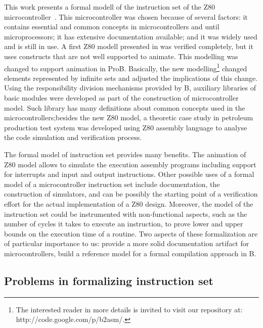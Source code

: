 \documentclass[a4paper]{llncs}
\begin{document}
This work presents a formal modell of the instruction set of the Z80 
microcontroller~\cite{Z80_manual}. This microcontroller
was chosen because of several factors: it contains essential and common
concepts in microcontrollers and until microprocessors; it has extensive
documentation available; and it was widely used and is still in use. 
A first Z80 modell presented in \cite{Valerio_SBMF09} was verified completely,
but it uses constructs that are not well supported to animate. 
This modelling was changed to support animation in ProB\cite{proB}.
Basically, the new modelling\footnote{The interested reader in more
details is invited to visit our repository at: http://code.google.com/p/b2asm/.}
changed elements represented by infinite sets and adjusted the implications
of this change. Using the responsibility division mechanisms provided by B, auxiliary
libraries of basic modules were developed as part of the construction of microcontroller
model. Such library has many definitions about common concepts used in
the microcontrollers;besides the new Z80 model, a theoretic case study in 
petroleum production test system was developed using Z80 assembly language
to analyse the code simulation and verification process.


The formal model of instruction set provides many benefits. The animation of 
Z80 model allows to simulate the execution assembly programs including
support for interrupts and input and output instructions. Other possible uses
of a formal model of a microcontroller instruction set include documentation,
the construction of simulators, and can be possibly the starting point of a 
verification effort for the actual implementation of a Z80 design. Moreover, 
the model of the instruction set could be instrumented with non-functional
aspects, such as the number of cycles it takes to execute an instruction, to
prove lower and upper bounds on the execution time of a routine.
Two aspects of these formalization are of particular importance to us:
provide a more solid documentation artifact for microcontrollers, 
build a reference model for a formal compilation approach in B.


\subsection{Problems in formalizing instruction set}
\end{document}
